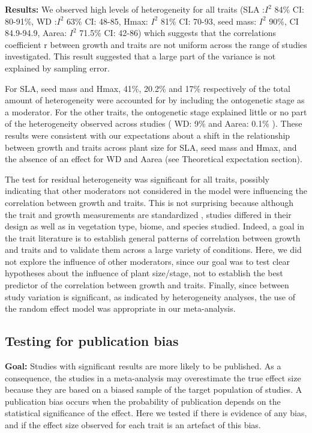 \documentclass[10pt,twoside]{article}\usepackage[]{graphicx}\usepackage[]{color}
\begin{document}
\noindent\textbf{Results:} We observed high levels of heterogeneity for all traits (SLA :$I^{2}$ 84\% CI: 80-91\%, WD :$I^{2}$ 63\% CI: 48-85, Hmax: $I^{2}$ 81\% CI: 70-93, seed mass: $I^{2}$ 90\%, CI 84.9-94.9, Aarea: $I^{2}$ 71.5\% CI: 42-86) which suggests that the correlations coefficient r between growth and traits are not uniform across the range of studies investigated. This result suggested that a large part of the variance is not explained by sampling error.

For SLA, seed mass and Hmax, 41\%, 20.2\% and 17\% respectively of the total amount of heterogeneity were accounted for by including the ontogenetic stage as a moderator. For the other traits, the ontogenetic stage explained little or no part of the heterogeneity observed across studies ( WD: 9\% and Aarea: 0.1\% ). These results were consistent with our expectations about a shift in the relationship between growth and traits across plant size for SLA, seed mass and Hmax, and the absence of an effect for WD and Aarea (see Theoretical expectation section).

The test for residual heterogeneity was significant for all traits, possibly indicating that other moderators not considered in the model were influencing the correlation between growth and traits. This is not surprising because although the trait and growth measurements are standardized \citep{Cornelissen:2003gw}, studies differed in their design as well as in vegetation type, biome, and species studied. Indeed, a goal in the trait literature is to establish general patterns of correlation between growth and traits and to validate them across a large variety of conditions. Here, we did not explore the influence of other moderators, since our goal was to test clear hypotheses about the influence of plant size/stage, not to establish the best predictor of the correlation between growth and traits. Finally, since between study variation is significant, as indicated by heterogeneity analyses, the use of the random effect model was appropriate in our meta-analysis.
\clearpage

\subsection{Testing for publication bias}
\noindent\textbf{Goal:} Studies with significant results are more likely to be published. As a consequence, the studies in a meta-analysis may overestimate the true effect size because they are based on a biased sample of the target population of studies. A publication bias occurs when the probability of publication depends on the statistical significance of the effect. Here we tested if there is evidence of any bias, and if the effect size observed for each trait is an artefact of this bias.
\end{document}
